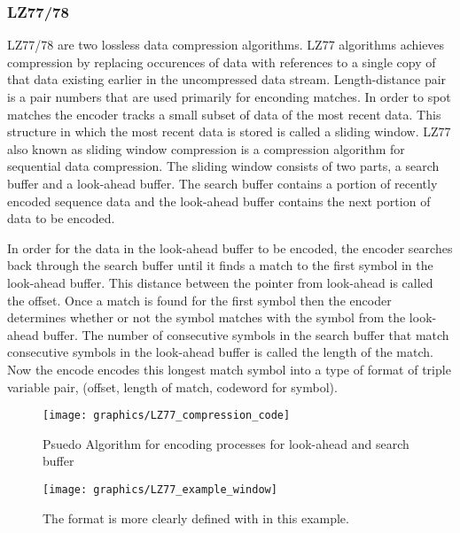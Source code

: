 \documentclass[letterpaper, 12pt]{article}
\begin{document}
\subsubsection{LZ77/78}
LZ77/78 are two lossless data compression algorithms. LZ77 algorithms achieves compression by replacing
occurences of data with references to a single copy of that data existing earlier in the uncompressed
data stream. Length-distance pair is a pair numbers that are used primarily for enconding matches. In order
to spot matches the encoder tracks a small subset of data of the most recent data. This structure in which
the most recent data is stored is called a sliding window. LZ77 also known as sliding window compression is
a compression algorithm for sequential data compression. The sliding window consists of two parts, a search
buffer and a look-ahead buffer. The search buffer contains a portion of recently encoded sequence data and
the look-ahead buffer contains the next portion of data to be encoded.
\par\vspace{\baselineskip}
In order for the data in the look-ahead buffer to be encoded, the encoder searches back through the
search buffer until it finds a match to the first symbol in the look-ahead buffer. This distance between
the pointer from look-ahead is called the offset. Once a match is found for the first symbol then the encoder
determines whether or not the symbol matches with the symbol from the look-ahead buffer. The number of
consecutive symbols in the search buffer that match consecutive symbols in the look-ahead buffer is called
the length of the match. Now the encode encodes this longest match symbol into a type of format of triple
variable pair, (offset, length of match, codeword for symbol).
\par\vspace{\baselineskip}
\begin{figure}
  \centering
  \texttt{[image: graphics/LZ77\_compression\_code]}
  \caption{Psuedo Algorithm for encoding processes for look-ahead and search buffer}
\end{figure}

\begin{figure}
  \centering
  \texttt{[image: graphics/LZ77\_example\_window]}
  \caption{The format is more clearly defined with in this example.}
\end{figure}
\newpage
\end{document}
